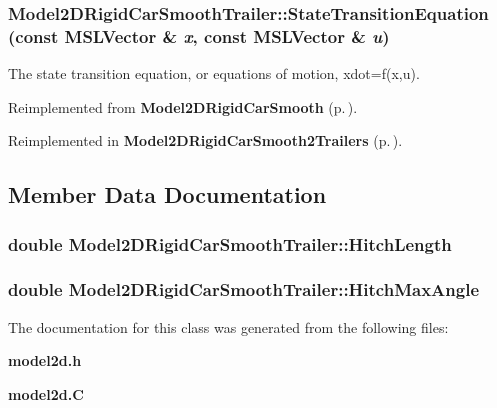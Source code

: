 \subsubsection{ Model2DRigid\-Car\-Smooth\-Trailer::State\-Transition\-Equation (const {\bf MSLVector} \& {\em x}, const {\bf MSLVector} \& {\em u})\hspace{0.3cm}{\tt  [virtual]}}\label{classModel2DRigidCarSmoothTrailer_a2}


The state transition equation, or equations of motion, xdot=f(x,u).



Reimplemented from {\bf Model2DRigid\-Car\-Smooth} {\rm (p.\,\pageref{classModel2DRigidCarSmooth_a2})}.

Reimplemented in {\bf Model2DRigid\-Car\-Smooth2Trailers} {\rm (p.\,\pageref{classModel2DRigidCarSmooth2Trailers_a2})}.

\subsection{Member Data Documentation}
\subsubsection{\setlength{\rightskip}{0pt plus 5cm}double Model2DRigid\-Car\-Smooth\-Trailer::Hitch\-Length}\label{classModel2DRigidCarSmoothTrailer_m0}


\subsubsection{\setlength{\rightskip}{0pt plus 5cm}double Model2DRigid\-Car\-Smooth\-Trailer::Hitch\-Max\-Angle}\label{classModel2DRigidCarSmoothTrailer_m1}




The documentation for this class was generated from the following files:\begin{CompactItemize}
\item 
{\bf model2d.h}\item 
{\bf model2d.C}\end{CompactItemize}
